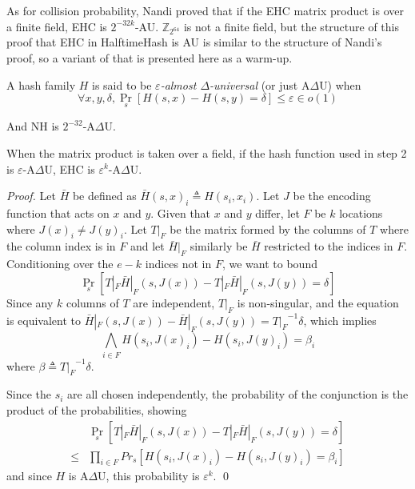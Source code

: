 \documentclass[runningheads]{llncs}
\newcommand{\ints}{\mathbb{Z}}
\begin{document}



As for collision probability, Nandi proved that if the EHC matrix product is over a finite field, EHC is $2^{-32k}$-AU.
$\ints_{2^{64}}$ is not a finite field, but the structure of this proof that EHC in HalftimeHash is AU is similar to the structure of Nandi's proof, so a variant of that is presented here as a warm-up.  \cite{ehc-nandi}

\begin{definition}
  A hash family $H$ is said to be {\em $\varepsilon$-almost $\Delta$-universal} (or just A$\Delta$U) when
  \[
  \forall x,y,\delta, \Pr_s[H(s,x) - H(s,y) = \delta] \leq \varepsilon \in o(1)
  \]
\end{definition}

And NH is $2^{-32}$-A$\Delta$U. \cite{umac}


\begin{lemma}
  When the matrix product is taken over a field, if the hash function used in step 2 is $\varepsilon$-A$\Delta$U, EHC is $\varepsilon^k$-A$\Delta$U.
\end{lemma}
\begin{proof}
  Let $\bar{H}$ be defined as $\bar{H}(s, x)_i \triangleq H(s_i, x_i)$.
  Let $J$ be the encoding function that acts on $x$ and $y$.
  Given that $x$ and $y$ differ, let $F$ be $k$ locations where $J(x)_i \neq J(y)_i$.
  Let $T|_F$ be the matrix formed by the columns of $T$ where the column index is in $F$ and let $\bar{H}|_F$ similarly be $\bar{H}$ restricted to the indices in $F$.
  Conditioning over the $e -k$ indices not in $F$, we want to bound
  \begin{equation}
    \label{ehc-delta}
    \Pr_s[T|_F \bar{H}|_F(s, J(x)) - T|_F \bar{H}|_F(s, J(y)) = \delta]
  \end{equation}
  Since any $k$ columns of $T$ are independent, $T|_F$ is non-singular, and the equation is equivalent to $\bar{H}|_F(s, J(x)) - \bar{H}|_F(s, J(y)) = {T|_F}^{-1} \delta$, which implies
  \[
  \bigwedge_{i \in F} H(s_i, J(x)_i) - H(s_i, J(y)_i) = \beta_i
  \]
  where $\beta \triangleq {T|_F}^{-1} \delta$.

  Since the $s_i$ are all chosen independently, the probability of the conjunction is the product of the probabilities, showing
  \[
  \begin{array}{rl}
    &  \Pr_s[T|_F \bar{H}|_F (s,J(x)) - T|_F \bar{H}|_F(s,J(y)) = \delta] \\
  \leq &  \prod_{i \in F} Pr_s[H(s_i, J(x)_i) - H(s_i, J(y)_i) = \beta_i]
  \end{array}
  \]
  and since $H$ is A$\Delta$U, this probability is $\varepsilon^k$.  \qed
\end{proof}
\end{document}
